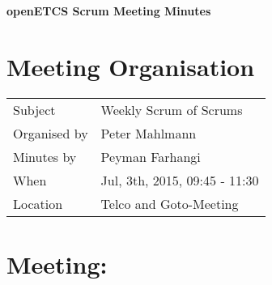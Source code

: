 \documentclass[a4paper, 11pt]{article}
\begin{document}
{\begin{center}\huge\bf openETCS Scrum Meeting Minutes\end{center}}
\section{Meeting Organisation}

\renewcommand{\arraystretch}{1.5}
\begin{supertabular}{m{.2\textwidth}m{.8\textwidth}}
Subject & Weekly Scrum of Scrums\\
Organised by &Peter Mahlmann\\
Minutes by & Peyman Farhangi\\
When & Jul, 3th, 2015, 09:45 - 11:30\\
Location & Telco and Goto-Meeting\\
\end{supertabular}

\renewcommand{\arraystretch}{1.0}
\section{Meeting:}
\end{document}
